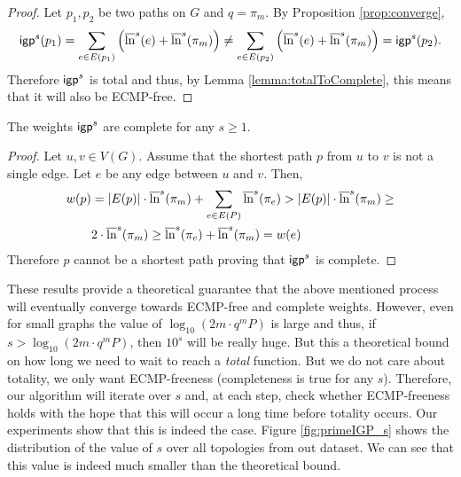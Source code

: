 \begin{proof}
Let $p_1, p_2$ be two paths on $G$ and $q = \pi_m$. By Proposition \ref{prop:converge}, 
$$
\mathsf{igp}^s(p_1) = \sum_{e \in E(p_1)} \left( \overline{\ln}^s(e) + \overline{\ln}^s(\pi_m) \right) \neq \sum_{e \in E(p_2)} \left( \overline{\ln}^s(e) + \overline{\ln}^s(\pi_m) \right) = \mathsf{igp}^s(p_2).
$$
Therefore $\mathsf{igp}^s$ is total and thus, by Lemma \ref{lemma:totalToComplete}, this means that 
it will also be ECMP-free.
\end{proof}

\begin{proposition}
The weights $\mathsf{igp}^s$ are complete for any $s \geq 1$.
\end{proposition}

\begin{proof}
Let $u, v \in V(G)$. Assume that the shortest path $p$ from $u$ to $v$ is not a single edge.
Let $e$ be any edge between $u$ and $v$. Then,
\begin{align*}
\tiny
w(p) & = |E(p)| \cdot \overline{\ln}^s(\pi_m) + \sum_{e \in E(P)} \overline{\ln}^s(\pi_e) > |E(p)| \cdot \overline{\ln}^s(\pi_m) \geq \\
& 2 \cdot \overline{\ln}^s(\pi_m) \geq \overline{\ln}^s(\pi_e) + \overline{\ln}^s(\pi_m) = w(e)
\end{align*}
Therefore $p$ cannot be a shortest path proving that $\mathsf{igp}^s$ is complete.
\end{proof}

These results provide a theoretical guarantee that the above mentioned process will eventually converge towards 
ECMP-free and complete weights. However, even for small graphs the value of $\log_{10} \left( 2 m \cdot q^m P \right)$ is
large and thus, if $s > \log_{10} \left( 2 m \cdot q^m P \right)$, then $10^s$ will be really huge. But this a theoretical bound on how long we need to wait to reach a \emph{total} function.
But we do not care about totality, we only want ECMP-freeness (completeness is true for any $s$). Therefore, our algorithm
will iterate over $s$ and, at each step, check whether ECMP-freeness holds with the hope that this will occur a long time before
totality occurs. Our experiments show that this is indeed the case. Figure \ref{fig:primeIGP_s} shows the distribution of the
value of $s$ over all topologies from out dataset. We can see that this value is indeed much smaller than the theoretical bound.

